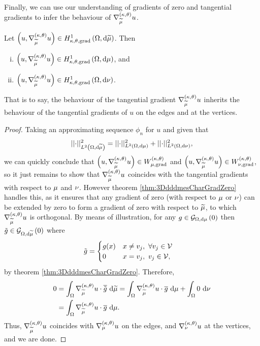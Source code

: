 Finally, we can use our understanding of gradients of zero and tangential gradients to infer the behaviour of $\nabla^{\left( \kappa, \theta \right)}_{\widetilde{\mu}}u$.
\begin{theorem} \label{thm:dddmesTangGradImplication}
	Let $\left( u,\nabla^{\left( \kappa, \theta \right)}_{\widetilde{\mu}}u \right)\in H^1_{\kappa,\theta,\mathrm{grad}}\left( \Omega, \mathrm{d}\widetilde{\mu} \right)$.
	Then
	\begin{enumerate}[(i)]
		\item $\left( u,\nabla^{\left( \kappa, \theta \right)}_{\widetilde{\mu}}u \right)\in H^1_{\kappa,\theta,\mathrm{grad}}\left( \Omega, \mathrm{d}\mu \right)$, and
		\item $\left( u,\nabla^{\left( \kappa, \theta \right)}_{\widetilde{\mu}}u \right)\in H^1_{\kappa,\theta,\mathrm{grad}}\left( \Omega, \mathrm{d}\nu \right)$.
	\end{enumerate}
\end{theorem}
That is to say, the behaviour of the tangential gradient $\nabla^{\left( \kappa, \theta \right)}_{\widetilde{\mu}}u$ inherits the behaviour of the tangential gradients of $u$ on the edges and at the vertices.
\begin{proof}
	Taking an approximating sequence $\phi_n$ for $u$ and given that
	\begin{align*}
		\lvert\lvert \cdot \rvert\rvert_{L^{2}\left( \Omega,\mathrm{d} \widetilde{\mu} \right)}^2 = \lvert\lvert \cdot \rvert\rvert_{L^{2}\left( \Omega,\mathrm{d} \mu \right)}^2 + \lvert\lvert \cdot \rvert\rvert_{L^{2}\left( \Omega,\mathrm{d} \nu \right)}^2,
	\end{align*}
	we can quickly conclude that $\left( u,\nabla^{\left( \kappa, \theta \right)}_{\widetilde{\mu}}u \right)\in W_{\mu, \mathrm{grad}}^{\left( \kappa, \theta \right)}$ and $\left( u,\nabla^{\left( \kappa, \theta \right)}_{\widetilde{\mu}}u \right)\in W_{\nu, \mathrm{grad}}^{\left( \kappa, \theta \right)}$, so it just remains to show that $\nabla^{\left( \kappa, \theta \right)}_{\widetilde{\mu}}u$ coincides with the tangential gradients with respect to $\mu$ and $\nu$.
	However theorem \ref{thm:3DdddmesCharGradZero} handles this, as it ensures that any gradient of zero (with respect to $\mu$ or $\nu$) can be extended by zero to form a gradient of zero with respect to $\widetilde{\mu}$, to which $\nabla^{\left( \kappa, \theta \right)}_{\widetilde{\mu}}u$ is orthogonal.
	By means of illustration, for any $g\in\mathcal{G}_{ \Omega, \mathrm{d}\mu}\left( 0 \right)$ then $\tilde{g}\in\mathcal{G}_{ \Omega, \mathrm{d}\widetilde{\mu}}\left( 0 \right)$ where
	\begin{align*}
		\tilde{g} &= 
		\begin{cases} g(x) & x\neq v_j, \ \forall v_j\in\mathcal{V} \\ 0 & x=v_j, \ v_j\in\mathcal{V}, \end{cases}
	\end{align*}
	by theorem \ref{thm:3DdddmesCharGradZero}.
	Therefore,
	\begin{align*}
		0 &= \int_{\Omega} \nabla^{\left( \kappa, \theta \right)}_{\widetilde{\mu}}u\cdot\overline{\tilde{g}}  \ \mathrm{d}\widetilde{\mu}
		= \int_{\Omega} \nabla^{\left( \kappa, \theta \right)}_{\widetilde{\mu}}u\cdot\overline{g}  \ \mathrm{d}\mu + \int_{\Omega} 0  \ \mathrm{d}\nu \\
		&= \int_{\Omega} \nabla^{\left( \kappa, \theta \right)}_{\widetilde{\mu}}u\cdot\overline{g}  \ \mathrm{d}\mu.
	\end{align*}
	Thus, $\nabla^{\left( \kappa, \theta \right)}_{\widetilde{\mu}}u$ coincides with $\nabla^{\left( \kappa, \theta \right)}_{\mu}u$ on the edges, and $\nabla^{\left( \kappa, \theta \right)}_{\nu}u$ at the vertices, and we are done.
\end{proof}
